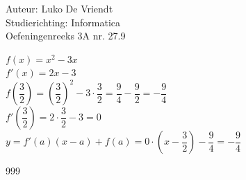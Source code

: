\documentclass[a4paper]{article}
\begin{document}
\noindent \large Auteur: Luko De Vriendt\\
\noindent \large Studierichting: Informatica\\
\noindent \large Oefeningenreeks 3A nr. 27.9\\

\medskip

\normalsize

$f(x) = x^2 - 3x$ \\

$f'(x) = 2x - 3$ \\

$f\left(\dfrac{3}{2}\right)= \left(\dfrac{3}{2}\right)^2 -3\cdot\dfrac{3}{2} = \dfrac{9}{4} - \dfrac{9}{2} = -\dfrac{9}{4}$ \\

$f'\left(\dfrac{3}{2}\right) = 2\cdot\dfrac{3}{2} - 3 = 0$ \\

$y = f'(a)(x-a) + f(a) = 0\cdot(x-\dfrac{3}{2})-\dfrac{9}{4} = -\dfrac{9}{4}$

\begin{thebibliography}{999}
\end{thebibliography}
\end{document}
